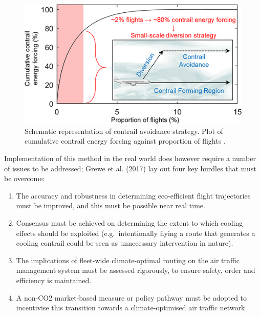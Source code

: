 \begin{figure}[H]
  \centering
  \includegraphics[width=0.7\linewidth]{Teoh.png}
  \caption{Schematic representation of contrail avoidance strategy. Plot of cumulative contrail energy forcing against proportion of flights \cite{Teoh2020}.}
  \label{Teoh}
\end{figure}

Implementation of this method in the real world does however require a number of issues to be addressed; Grewe et al. (2017) \cite{Grewe2017} lay out four key hurdles that must be overcome: 

\begin{enumerate}
	\item The accuracy and robustness in determining eco-efficient flight trajectories must be improved, and this must be possible near real time.
	\item Consensus must be achieved on determining the extent to which cooling effects should be exploited (e.g.\ intentionally flying a route that generates a cooling contrail could be seen as unnecessary intervention in nature).
	\item The implications of fleet-wide climate-optimal routing on the air traffic management system must be assessed rigorously, to ensure safety, order and efficiency is maintained.
	\item A non-CO2 market-based measure or policy pathway must be adopted to incentivise this transition towards a climate-optimised air traffic network.
\end{enumerate}

